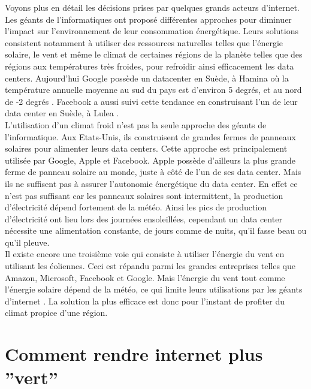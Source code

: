 \documentclass[a4paper,twocolumn,12pt]{article}
\begin{document}
	Voyons plus en détail les décisions prises par quelques grands acteurs d’internet. Les géants de l’informatiques ont proposé différentes approches pour diminuer l’impact sur l’environnement de leur consommation énergétique. Leurs solutions consistent notamment à utiliser des ressources naturelles telles que l'énergie solaire, le vent et même le climat de certaines régions de la planète telles que des régions aux températures très froides, pour refroidir ainsi efficacement les data centers. Aujourd’hui Google possède un datacenter en Suède, à Hamina où la température annuelle moyenne au sud du pays est d'environ 5 degrés, et au nord de -2 degrés \cite{13,14}. Facebook a aussi suivi cette tendance en construisant l’un de leur data center en Suède, à Lulea \cite{15}. \\
	
	L’utilisation d’un climat froid n'est pas la seule approche des géants de l’informatique. Aux Etats-Unis, ils construisent de grandes fermes de panneaux solaires pour alimenter leurs data centers. Cette approche est principalement utilisée par Google, Apple et Facebook. Apple possède d’ailleurs la plus grande ferme de panneau solaire au monde, juste à côté de l’un de ses data center. Mais ils ne suffisent pas à assurer l’autonomie énergétique du data center. En effet ce n’est pas suffisant car les panneaux solaires sont intermittent, la production d'électricité dépend fortement de la météo. Ainsi les pics de production d'électricité ont lieu lors des journées ensoleillées, cependant un data center nécessite une alimentation constante, de jours comme de nuits, qu’il fasse beau ou qu’il pleuve. \\

	Il existe encore une troisième voie qui consiste à utiliser l'énergie du vent en utilisant les éoliennes. Ceci est répandu parmi les grandes entreprises telles que Amazon, Microsoft, Facebook et Google. Mais l'énergie du vent tout comme l'énergie solaire dépend de la météo, ce qui limite leurs utilisations par les géants d'internet \cite{16}. La solution la plus efficace est donc pour l'instant de profiter du climat propice d'une région.

\section{Comment rendre internet plus ''vert''}
\end{document}

